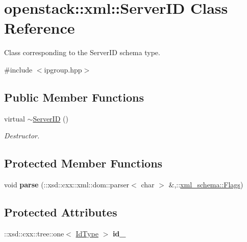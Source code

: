 \hypertarget{classopenstack_1_1xml_1_1ServerID}{
\section{openstack::xml::ServerID Class Reference}
\label{classopenstack_1_1xml_1_1ServerID}
}


Class corresponding to the ServerID schema type.  




{\ttfamily \#include $<$ipgroup.hpp$>$}

\subsection*{Public Member Functions}
\begin{DoxyCompactItemize}
\item 
\hypertarget{classopenstack_1_1xml_1_1ServerID_aa5862e056073a910607383edeb265bfd}{
virtual \hyperlink{classopenstack_1_1xml_1_1ServerID_aa5862e056073a910607383edeb265bfd}{$\sim$ServerID} ()}
\label{classopenstack_1_1xml_1_1ServerID_aa5862e056073a910607383edeb265bfd}

\begin{DoxyCompactList}\small\item\em Destructor. \item\end{DoxyCompactList}\end{DoxyCompactItemize}
\subsection*{Protected Member Functions}
\begin{DoxyCompactItemize}
\item 
\hypertarget{classopenstack_1_1xml_1_1ServerID_acaa1e5929aee4d50f9994b49e1855538}{
void {\bfseries parse} (::xsd::cxx::xml::dom::parser$<$ char $>$ \&,::\hyperlink{namespacexml__schema_affb4c227cbd9aa7453dd1dc5a1401943}{xml\_\-schema::Flags})}
\label{classopenstack_1_1xml_1_1ServerID_acaa1e5929aee4d50f9994b49e1855538}

\end{DoxyCompactItemize}
\subsection*{Protected Attributes}
\begin{DoxyCompactItemize}
\item 
\hypertarget{classopenstack_1_1xml_1_1ServerID_abda13b8654de5b4896cdf6a4a35c4b92}{
::xsd::cxx::tree::one$<$ \hyperlink{classopenstack_1_1xml_1_1ServerID_aa988a90cc3ff65df56778e87af119459}{IdType} $>$ {\bfseries id\_\-}}
\label{classopenstack_1_1xml_1_1ServerID_abda13b8654de5b4896cdf6a4a35c4b92}

\end{DoxyCompactItemize}
